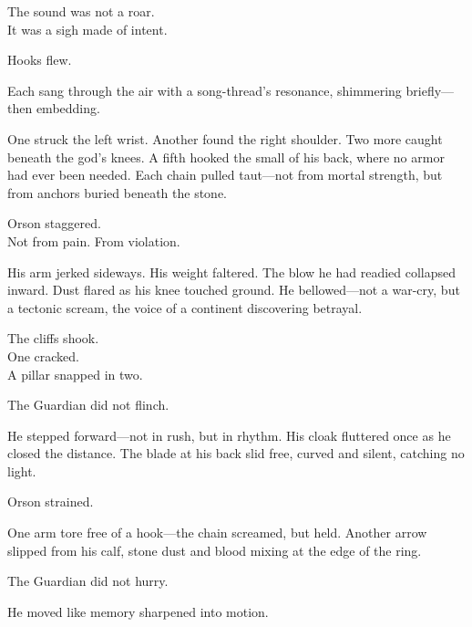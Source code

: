 \documentclass[9pt]{article}
\begin{document}
\vspace{0.5em}
The sound was not a roar.\\
It was a sigh made of intent.

\vspace{0.5em}
Hooks flew.

\vspace{0.5em}
Each sang through the air with a song-thread’s resonance, shimmering briefly---then embedding.

\vspace{0.5em}
One struck the left wrist. Another found the right shoulder. Two more caught beneath the god’s knees. A fifth hooked the small of his back, where no armor had ever been needed. Each chain pulled taut---not from mortal strength, but from anchors buried beneath the stone.

\vspace{0.5em}
Orson staggered.\\
Not from pain. From violation.

\vspace{0.5em}
His arm jerked sideways. His weight faltered. The blow he had readied collapsed inward. Dust flared as his knee touched ground. He bellowed---not a war-cry, but a tectonic scream, the voice of a continent discovering betrayal.

\vspace{0.5em}
The cliffs shook.\\
One cracked.\\
A pillar snapped in two.

\vspace{0.5em}
The Guardian did not flinch.

\vspace{0.5em}
He stepped forward---not in rush, but in rhythm. His cloak fluttered once as he closed the distance. The blade at his back slid free, curved and silent, catching no light.

\vspace{0.5em}
Orson strained.

\vspace{0.5em}
One arm tore free of a hook---the chain screamed, but held. Another arrow slipped from his calf, stone dust and blood mixing at the edge of the ring.

\vspace{0.5em}
The Guardian did not hurry.

\vspace{0.5em}
He moved like memory sharpened into motion.
\end{document}
